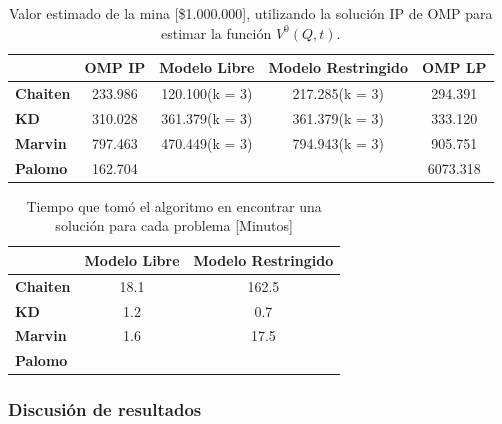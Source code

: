 \documentclass[12pt,letterpaper]{article}
\begin{document}
\begin{table}[H]
\centering
\begin{tabular}{|l|cccc|}
\hline
                 & \multicolumn{1}{l}{\textbf{OMP IP}} & \textbf{Modelo Libre} & \textbf{Modelo Restringido} & \multicolumn{1}{l}{\textbf{OMP LP}} \\ \hline
\textbf{Chaiten} & 233.986                             & 120.100(k = 3)        & 217.285(k = 3)              & 294.391                             \\ \hline
\textbf{KD}      & 310.028                             & 361.379(k = 3)        & 361.379(k = 3)              & 333.120                             \\ \hline
\textbf{Marvin}  & 797.463                             & 470.449(k = 3)        & 794.943(k = 3)              & 905.751                             \\ \hline
\textbf{Palomo}  & 162.704                             &                       &                             & 6073.318                            \\ \hline
\end{tabular}
\caption{Valor estimado de la mina [\$1.000.000], utilizando la solución IP de OMP para estimar la función $V^0(Q,t)$.}
\end{table}

\begin{table}[H]
\centering
\begin{tabular}{|l|cc|}
\cline{1-3}
                 & \textbf{Modelo Libre} & \textbf{Modelo Restringido} \\ \hline
\textbf{Chaiten} & 18.1                  &  162.5                       \\ \hline
\textbf{KD}      & 1.2                   & 0.7                         \\ \hline
\textbf{Marvin}  & 1.6                   & 17.5                        \\ \hline
\textbf{Palomo}  &                       &                             \\ \hline
\end{tabular}
\caption{Tiempo que tomó el algoritmo en encontrar una solución para cada problema [Minutos]}
\end{table}

\subsubsection{ Discusión de resultados}
\end{document}

